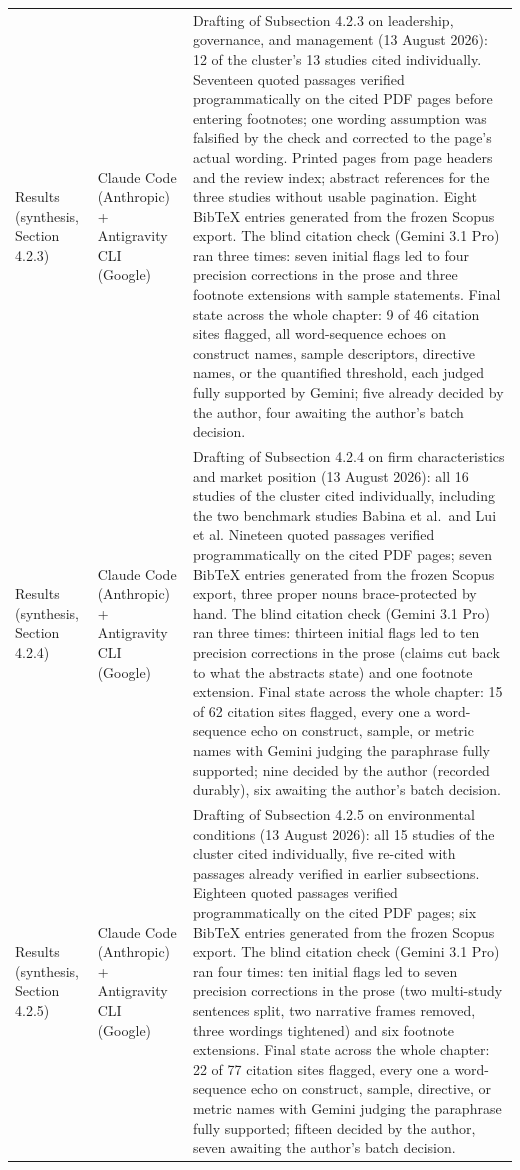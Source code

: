 \begin{longtable}{@{}p{2.9cm}p{3.2cm}p{9.0cm}@{}}
\addlinespace
Results (synthesis, Section 4.2.3) & Claude Code (Anthropic) + Antigravity CLI (Google) & Drafting of Subsection 4.2.3 on leadership, governance, and management (13 August 2026): 12 of the cluster's 13 studies cited individually. Seventeen quoted passages verified programmatically on the cited PDF pages before entering footnotes; one wording assumption was falsified by the check and corrected to the page's actual wording. Printed pages from page headers and the review index; abstract references for the three studies without usable pagination. Eight BibTeX entries generated from the frozen Scopus export. The blind citation check (Gemini 3.1 Pro) ran three times: seven initial flags led to four precision corrections in the prose and three footnote extensions with sample statements. Final state across the whole chapter: 9 of 46 citation sites flagged, all word-sequence echoes on construct names, sample descriptors, directive names, or the quantified threshold, each judged fully supported by Gemini; five already decided by the author, four awaiting the author's batch decision. \\
\addlinespace
Results (synthesis, Section 4.2.4) & Claude Code (Anthropic) + Antigravity CLI (Google) & Drafting of Subsection 4.2.4 on firm characteristics and market position (13 August 2026): all 16 studies of the cluster cited individually, including the two benchmark studies Babina et al.\ and Lui et al. Nineteen quoted passages verified programmatically on the cited PDF pages; seven BibTeX entries generated from the frozen Scopus export, three proper nouns brace-protected by hand. The blind citation check (Gemini 3.1 Pro) ran three times: thirteen initial flags led to ten precision corrections in the prose (claims cut back to what the abstracts state) and one footnote extension. Final state across the whole chapter: 15 of 62 citation sites flagged, every one a word-sequence echo on construct, sample, or metric names with Gemini judging the paraphrase fully supported; nine decided by the author (recorded durably), six awaiting the author's batch decision. \\
\addlinespace
Results (synthesis, Section 4.2.5) & Claude Code (Anthropic) + Antigravity CLI (Google) & Drafting of Subsection 4.2.5 on environmental conditions (13 August 2026): all 15 studies of the cluster cited individually, five re-cited with passages already verified in earlier subsections. Eighteen quoted passages verified programmatically on the cited PDF pages; six BibTeX entries generated from the frozen Scopus export. The blind citation check (Gemini 3.1 Pro) ran four times: ten initial flags led to seven precision corrections in the prose (two multi-study sentences split, two narrative frames removed, three wordings tightened) and six footnote extensions. Final state across the whole chapter: 22 of 77 citation sites flagged, every one a word-sequence echo on construct, sample, directive, or metric names with Gemini judging the paraphrase fully supported; fifteen decided by the author, seven awaiting the author's batch decision. \\

\end{longtable}
